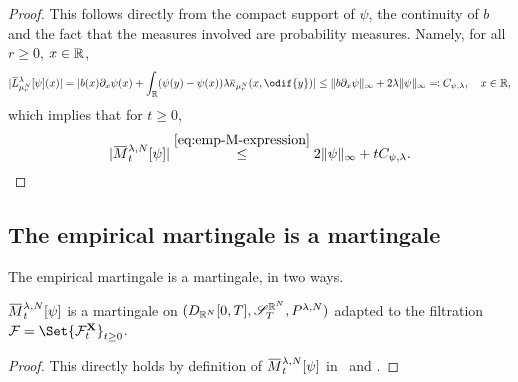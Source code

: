 \begin{proof}
  This follows directly from the compact support of \( \psi \), the continuity of \( b \) and the fact that the measures involved are probability measures.
  Namely, for all \( r \geq 0 \), \( x \in \mathbb{R} \),
  \begin{equation}
    \abs{ \ol{L}_{\mu_{r}^N}^{\lambda} [\psi](x) }
    = \abs{ b(x) \partial_x \psi(x) + \int_\potspace (\psi(y) - \psi(x)) \lambda \ol{\kappa}_{\mu_{r}^N}(x, \odif{y}) }
    \leq \norm{b \partial_x \psi}_\infty + 2 \lambda \norm{\psi}_\infty
    \eqqcolon C_{\psi, \lambda}, \quad x \in \potspace,
  \end{equation}
  which implies that for \( t \geq 0 \),
  \begin{equation*}   %
    \abs{ \ol{M}_t^{\lambda, N}[\psi] }
    \overset{\eqref{eq:emp-M-expression}}{\leq} 2 \norm{\psi}_\infty + t C_{\psi, \lambda}. \qedhere
  \end{equation*}
\end{proof}

\subsection{The empirical martingale is a martingale}

The empirical martingale is a martingale, in two ways.
\begin{corollary}\label{cor:easy-emp-M-mart}
  \(\ol{M}_t^{\lambda,N}[\psi]\) is a martingale on \((D_{\mathbb{R}^N}[0,T], \mathscr{S}_T^{\mathbb{R}^N}, P^{\lambda, N})\) adapted to the filtration \( \cF = \Set{\cF_t^\bm{X}}_{t\geq0} \).
\end{corollary}
\begin{proof}
  This directly holds by definition of \( \ol{M}_t^{\lambda,N}[\psi] \) in~ and .
\end{proof}

